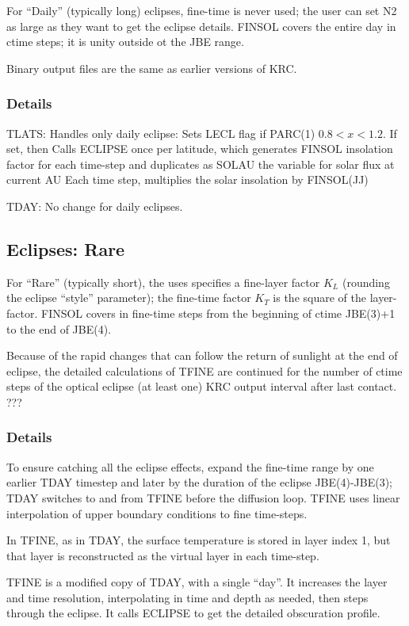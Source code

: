 \documentclass{article}
\begin{document}
For ``Daily'' (typically long) eclipses, fine-time is never used; the user can
set N2 as large as they want to get the eclipse details. FINSOL covers the
entire day in ctime steps; it is unity outside ot the JBE range.

Binary output files are the same as earlier versions of KRC.

\subsubsection{Details} 

TLATS: Handles only daily eclipse: Sets LECL flag if PARC(1) $ 0.8 < x< 1.2 $. If set, then
\qi Calls ECLIPSE once per latitude, which generates FINSOL insolation factor for each time-step
\qii and duplicates as SOLAU the variable for solar flux at current AU
\qi Each time step, multiplies the solar insolation by FINSOL(JJ)

TDAY: No change for daily eclipses. 

\subsection{Eclipses: Rare}
For ``Rare'' (typically short), the uses specifies a fine-layer factor $K_L$
(rounding the eclipse ``style'' parameter); the fine-time factor $K_T$ is the
square of the layer-factor. FINSOL covers in fine-time steps from the beginning
of ctime JBE(3)+1 to the end of JBE(4).

Because of the rapid changes that can follow the return of sunlight at the end
of eclipse, the detailed calculations of TFINE are continued for the number of
ctime steps of the optical eclipse (at least one) KRC output interval after last
contact. ???

\subsubsection{Details} 

To ensure catching all the eclipse effects, expand the fine-time range by one
earlier TDAY timestep and later by the duration of the eclipse JBE(4)-JBE(3);
TDAY switches to and from TFINE before the diffusion loop. TFINE uses linear
interpolation of upper boundary conditions to fine time-steps.

In TFINE, as in TDAY, the surface temperature is stored in layer index 1, but
that layer is reconstructed as the virtual layer in each time-step.

TFINE is a modified copy of TDAY, with a single ``day''. It increases the layer
and time resolution, interpolating in time and depth as
needed, then steps through the eclipse. It calls ECLIPSE to get the detailed
obscuration profile.
\end{document}
